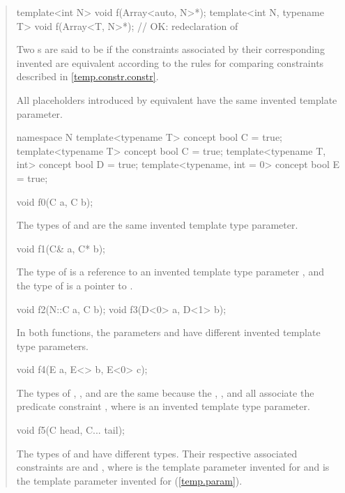 \begin{quote}
\begin{codeblock}
template<int N> void f(Array<auto, N>*);
template<int N, typename T> void f(Array<T, N>*); // OK: redeclaration of 
\end{codeblock}
\exitexample

\pnum
Two s are said to be 
 if the constraints associated by their corresponding
invented  are
equivalent according to the rules for comparing constraints described in 
\ref{temp.constr.constr}.

\pnum
All placeholders introduced by equivalent 
have the same invented template parameter.
% 
\enterexample
\begin{codeblock}
namespace N {
  template<typename T> concept bool C = true;
}
template<typename T> concept bool C = true;
template<typename T, int> concept bool D = true;
template<typename, int = 0> concept bool E = true;

void f0(C a, C b);
\end{codeblock}
The types of  and  are the same invented template
type parameter.
% 
\begin{codeblock}
void f1(C& a, C* b);
\end{codeblock}
The type of  is a reference to an invented template type parameter 
, and the type of  is a pointer to .
% 
\begin{codeblock}
void f2(N::C a, C b);
void f3(D<0> a, D<1> b);
\end{codeblock}
In both functions, the parameters  and
 have different invented template type parameters.
% 
\begin{codeblock}
void f4(E a, E<> b, E<0> c);
\end{codeblock}
The types of , , and  are the same because the 
 , , and 
 all associate the predicate constraint , where 
 is an invented template type parameter.
% 
\begin{codeblock}
void f5(C head, C... tail);
\end{codeblock}
The types of  and  have different types. Their
respective associated constraints are  and ,
where  is the template parameter invented for  and
 is the template parameter invented for  (\ref{temp.param}).
\end{quote}
